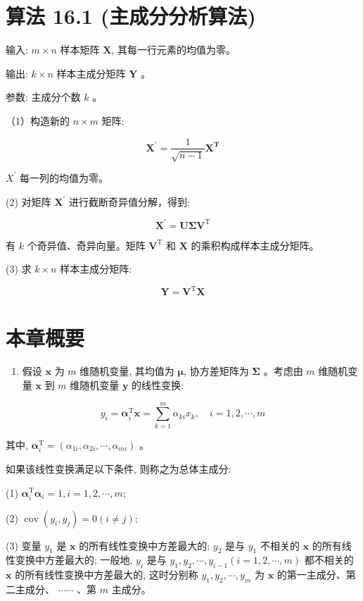 \documentclass[10pt]{article}
\begin{document}
\section*{算法 16.1 (主成分分析算法)}
输入: $m \times n$ 样本矩阵 $\boldsymbol{X}$, 其每一行元素的均值为零。

输出: $k \times n$ 样本主成分矩阵 $\boldsymbol{Y}$ 。

参数: 主成分个数 $k$ 。

（1）构造新的 $n \times m$ 矩阵:

$$
\boldsymbol{X}^{\prime}=\frac{1}{\sqrt{n-1}} \boldsymbol{X}^{\mathbf{T}}
$$

$X^{\prime}$ 每一列的均值为零。

(2) 对矩阵 $\boldsymbol{X}^{\prime}$ 进行截断奇异值分解，得到:

$$
\boldsymbol{X}^{\prime}=\boldsymbol{U} \boldsymbol{\Sigma} \boldsymbol{V}^{\mathrm{T}}
$$

有 $k$ 个奇异值、奇异向量。矩阵 $\boldsymbol{V}^{\mathrm{T}}$ 和 $\boldsymbol{X}$ 的乘积构成样本主成分矩阵。

(3) 求 $k \times n$ 样本主成分矩阵:

$$
\boldsymbol{Y}=\boldsymbol{V}^{\mathrm{T}} \boldsymbol{X}
$$

\section*{本章概要}
\begin{enumerate}
  \item 假设 $\boldsymbol{x}$ 为 $m$ 维随机变量, 其均值为 $\boldsymbol{\mu}$, 协方差矩阵为 $\boldsymbol{\Sigma}$ 。考虑由 $m$ 维随机变量 $\boldsymbol{x}$ 到 $m$ 维随机变量 $\boldsymbol{y}$ 的线性变换:
\end{enumerate}

$$
y_{i}=\boldsymbol{\alpha}_{i}^{\mathrm{T}} \boldsymbol{x}=\sum_{k=1}^{m} \alpha_{k i} x_{k}, \quad i=1,2, \cdots, m
$$

其中, $\boldsymbol{\alpha}_{i}^{\mathrm{T}}=\left(\alpha_{1 i}, \alpha_{2 i}, \cdots, \alpha_{m i}\right)$ 。

如果该线性变换满足以下条件, 则称之为总体主成分:

(1) $\boldsymbol{\alpha}_{i}^{\mathrm{T}} \boldsymbol{\alpha}_{i}=1, i=1,2, \cdots, m$;

(2) $\operatorname{cov}\left(y_{i}, y_{j}\right)=0(i \neq j)$;

(3) 变量 $y_{1}$ 是 $\boldsymbol{x}$ 的所有线性变换中方差最大的; $y_{2}$ 是与 $y_{1}$ 不相关的 $\boldsymbol{x}$ 的所有线性变换中方差最大的; 一般地, $y_{i}$ 是与 $y_{1}, y_{2}, \cdots, y_{i-1}(i=1,2, \cdots, m)$ 都不相关的 $\boldsymbol{x}$ 的所有线性变换中方差最大的, 这时分别称 $y_{1}, y_{2}, \cdots, y_{m}$ 为 $\boldsymbol{x}$ 的第一主成分、第二主成分、 $\cdots \cdots$ 、第 $m$ 主成分。
\end{document}
